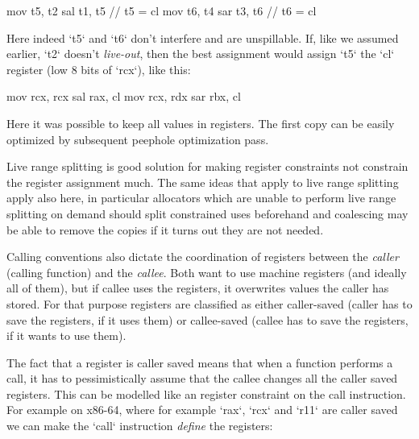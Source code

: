 \begtt
mov t5, t2
sal t1, t5 // t5 = cl
mov t6, t4
sar t3, t6 // t6 = cl
\endtt

Here indeed `t5` and `t6` don't interfere and are unspillable. If, like we
assumed earlier, `t2` doesn't {\em live-out}, then the best assignment would
assign `t5` the `cl` register (low 8 bits of `rcx`), like this:

\begtt
mov rcx, rcx
sal rax, cl
mov rcx, rdx
sar rbx, cl
\endtt

Here it was possible to keep all values in registers. The first copy can be
easily optimized by subsequent peephole optimization pass.

Live range splitting is good solution for making register constraints not
constrain the register assignment much. The same ideas that apply to live range
splitting apply also here, in particular allocators which are unable to perform
live range splitting on demand should split constrained uses beforehand and
coalescing may be able to remove the copies if it turns out they are not needed.

Calling conventions also dictate the coordination of registers between the {\em
caller} (calling function) and the {\em callee}. Both want to use machine
registers (and ideally all of them), but if callee uses the registers, it
overwrites values the caller has stored. For that purpose registers are
classified as either caller-saved (caller has to save the registers, if it uses
them) or callee-saved (callee has to save the registers, if it wants to use
them).

The fact that a register is caller saved means that when a function performs a
call, it has to pessimistically assume that the callee changes all the caller
saved registers.
This can be modelled like an register constraint on the call instruction. For
example on x86-64, where for example `rax`, `rcx` and `r11` are caller saved we
can make the `call` instruction {\em define} the registers:

